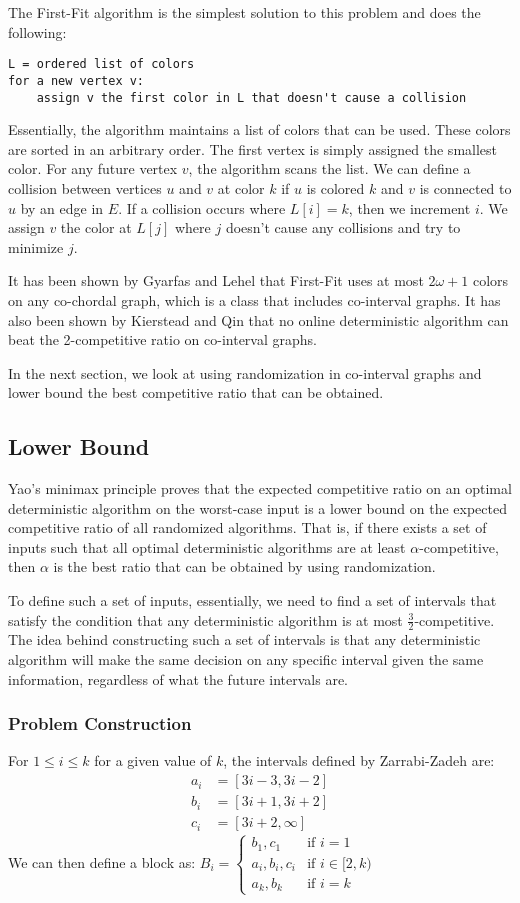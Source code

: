 The First-Fit algorithm is the simplest solution to this problem and does the following:
\begin{verbatim}
L = ordered list of colors
for a new vertex v:
    assign v the first color in L that doesn't cause a collision
\end{verbatim}
Essentially, the algorithm maintains a list of colors that can be used. These colors are sorted in an arbitrary order. The first vertex is simply assigned the smallest color. For any future vertex $v$, the algorithm scans the list. We can define a collision between vertices $u$ and $v$ at color $k$ if $u$ is colored $k$ and $v$ is connected to $u$ by an edge in $E$. If a collision occurs where $L[i] = k$, then we increment $i$. We assign $v$ the color at $L[j]$ where $j$ doesn't cause any collisions and try to minimize $j$.

It has been shown by Gyarfas and Lehel \cite{gyarfas} that First-Fit uses at most $2\omega+1$ colors on any co-chordal graph, which is a class that includes co-interval graphs. It has also been shown by Kierstead and Qin \cite{kierstead} that no online deterministic algorithm can beat the 2-competitive ratio on co-interval graphs.

In the next section, we look at using randomization in co-interval graphs and lower bound the best competitive ratio that can be obtained.
\subsection{Lower Bound}
Yao's minimax principle proves that the expected competitive ratio on an optimal deterministic algorithm on the worst-case input is a lower bound on the expected competitive ratio of all randomized algorithms. That is, if there exists a set of inputs such that all optimal deterministic algorithms are at least $\alpha$-competitive, then $\alpha$ is the best ratio that can be obtained by using randomization.

To define such a set of inputs, essentially, we need to find a set of intervals that satisfy the condition that any deterministic algorithm is at most $\frac{3}{2}$-competitive. The idea behind constructing such a set of intervals is that any deterministic algorithm will make the same decision on any specific interval given the same information, regardless of what the future intervals are.

\subsubsection{Problem Construction}
For $1\le i\le k$ for a given value of $k$, the intervals defined by Zarrabi-Zadeh \cite{zarrabi} are: 
\begin{align*}
	a_i &= [3i-3, 3i-2] \\
	b_i &= [3i+1, 3i+2] \\
	c_i &= [3i+2, \infty]
\end{align*}
We can then define a block as:
$B_i = \begin{cases} {b_1, c_1} &\mbox{if } i = 1 \\
{a_i, b_i, c_i} & \mbox{if } i \in [2,k) \\
 {a_k, b_k} &\mbox{if } i = k \end{cases}$ 

